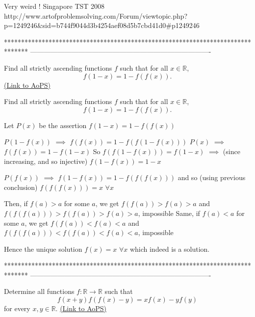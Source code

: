 \begin{solution}
	Very weird !
Singapore TST 2008
http://www.artofproblemsolving.com/Forum/viewtopic.php?p=1249246&sid=b744f9044d3b4254aef08d5b7cbd41d0#p1249246
\end{solution}
*******************************************************************************
-------------------------------------------------------------------------------

\begin{problem}
	Find all strictly ascending functions $f$ such that for all $x\in \mathbb R$,
\[f(1-x)=1-f(f(x)).\]
	\flushright \href{https://artofproblemsolving.com/community/c6h486623}{(Link to AoPS)}
\end{problem}



\begin{solution}
	\begin{tcolorbox}Find all strictly ascending functions $f$ such that for all $x\in \mathbb R$,
\[f(1-x)=1-f(f(x)).\]\end{tcolorbox}
Let $P(x)$ be the assertion $f(1-x)=1-f(f(x))$

$P(1-f(x))$ $\implies$ $f(f(x))=1-f(f(1-f(x)))$
$P(x)$ $\implies$ $f(f(x))=1-f(1-x)$
So $f(f(1-f(x)))=f(1-x)$ $\implies$ (since increasing, and so injective) $f(1-f(x))=1-x$

$P(f(x))$ $\implies$ $f(1-f(x))=1-f(f(f(x)))$ and so (using previous conclusion) $f(f(f(x)))=x$ $\forall x$

Then, if $f(a)>a$ for some $a$, we get $f(f(a))>f(a)>a$ and $f(f(f(a)))>f(f(a))>f(a)>a$, impossible
Same, if $f(a)<a$ for some $a$, we get $f(f(a))<f(a)<a$ and $f(f(f(a)))<f(f(a))<f(a)<a$, impossible

Hence the unique solution $\boxed{f(x)=x}$ $\forall x$ which indeed is a solution.
\end{solution}
*******************************************************************************
-------------------------------------------------------------------------------

\begin{problem}
	Determine all functions $f:\mathbb{R} \to \mathbb{R}$ such that \[f(x+y)f(f(x)-y)=xf(x)-yf(y)\] for every $x,y \in \mathbb{R}$.
	\flushright \href{https://artofproblemsolving.com/community/c6h487187}{(Link to AoPS)}
\end{problem}



